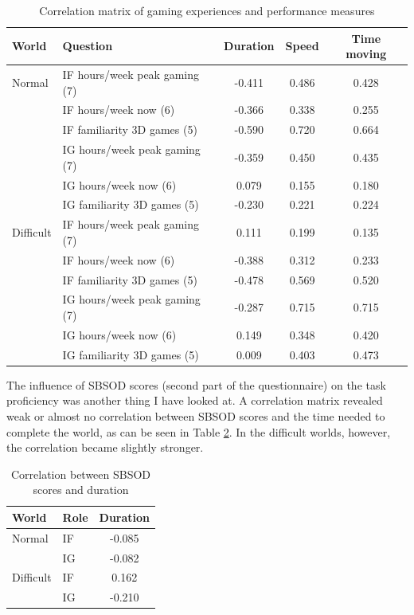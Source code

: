 \begin{table}[!htbp]
 \centering
\begin{tabular}{llccc}
\toprule
World & Question  & Duration & Speed & Time moving  \\
\midrule
Normal 	& IF hours/week peak gaming (7) 	& -0.411 &	0.486 &	0.428\\
 		& IF hours/week now 	(6)			& -0.366	 & 	0.338 &	0.255\\
 		& IF familiarity 3D games (5)	& -0.590	 &	0.720 &	0.664\\
 		& IG hours/week peak gaming (7) 	& -0.359 &	0.450 &	0.435\\
 		& IG hours/week now 	(6)			& 0.079	 &	0.155 &	0.180\\
 		& IG familiarity 3D games (5)	& -0.230 &	0.221 &	0.224\\
\midrule
Difficult& IF hours/week peak gaming (7) & 0.111 &	0.199 &	0.135\\
 		& IF hours/week now (6)			& -0.388 &	0.312 &	0.233\\
 		& IF familiarity 3D games (5)	& -0.478 &	0.569 &	0.520\\
 		& IG hours/week peak gaming (7) 	& -0.287 &	0.715 &	0.715\\
 		& IG hours/week now (6)			& 0.149 &	0.348 &	0.420\\
 		& IG familiarity 3D games (5)	& 0.009 &	0.403 &	0.473\\
\bottomrule
\end{tabular}
\caption{Correlation matrix of gaming experiences and performance measures}
\label{tab:demfactors-gaming}
\end{table}

The influence of SBSOD scores (second part of the questionnaire) on the task proficiency was another thing I have looked at. A correlation matrix revealed weak or almost no correlation between SBSOD scores and the time needed to complete the world, as can be seen in Table \ref{tab:demfactors-sbsod}. In the difficult worlds, however, the correlation became slightly stronger.

\begin{table}[!htbp]
 \centering
\begin{tabular}{llc}
\toprule
 World & Role   & Duration \\
\midrule
Normal & IF &	-0.085\\
 & IG &	-0.082\\
\midrule
Difficult & IF & 0.162\\
 & IG &	-0.210\\
\bottomrule
\end{tabular}
\caption{Correlation between SBSOD scores and duration}
\label{tab:demfactors-sbsod}
\end{table}

